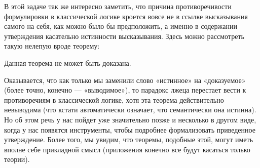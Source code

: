 В этой задаче так же интересно заметить, что причина противоречивости формулировки в классической логике кроется вовсе не в ссылке высказывания самого на себя, как можно было бы предположить, а именно в содержании утверждения касательно истинности высказывания. Здесь можно рассмотреть такую нелепую вроде теорему:

\begin{thm}Данная теорема не может быть доказана.\end{thm}

Оказывается, что как только мы заменили слово «истинное» на «доказуемое» (более точно, конечно — «выводимое»), то парадокс лжеца перестает вести к противоречиям в классической логике, хотя эта теорема действительно невыводима (что кстати автоматически означает, что семантически она истинна). Но об этом речь у нас пойдет уже значительно позже и несколько в другом виде, когда у нас появятся инструменты, чтобы подробнее формализовать приведенное утверждение. Более того, мы увидим, что теоремы, подобные этой, могут иметь вполне себе прикладной смысл (приложения конечно все будут касаться только теории).
